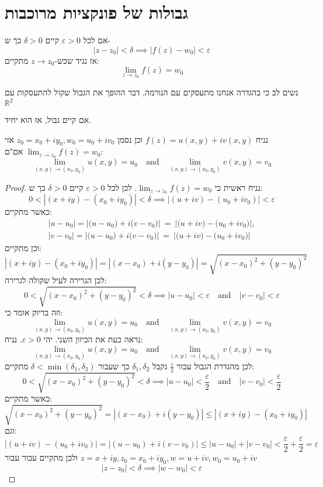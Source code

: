 \documentclass{tstextbook}
\begin{document}
\section{גבולות של פונקציות מרוכבות}

\begin{definition}
אם לכל \(\varepsilon>0\) קיים \(\delta>0\)  כך ש-
$$|z-z_{0}|<\delta\implies\lvert f(z)-w_{0} \rvert <\varepsilon$$
אז נגיד שכש-\(z\to z_{0}\) מתקיים:
$$\lim_{ z \to z_{0} } f(z)=w_{0}$$

\end{definition}
נשים לב כי בהגדרה אנחנו מתעסקים עם הנורמה, דבר ההופך את הגבול שקול להתעסקות עם \(\mathbb{R}^2\)

\begin{proposition}
אם קיים גבול, אז הוא יחיד.

\end{proposition}
\begin{proposition}
נניח \(f(z)=u(x,y)+i v(x,y)\) וכן נסמן \(z_{0}=x_{0}+iy_{0},w_{0}=u_{0}+iv_{0}\) אזי \(\operatorname*{lim}_{z\to z_{0}}f(z)=w_{0}\) אם"ם:
$$\operatorname*{lim}_{(x,y)\to(x_{0},y_{0})}u\left(x,y\right)=u_{0}\quad{\mathrm{and}}\quad\operatorname*{lim}_{(x,y)\to(x_{0},y_{0})}v\left(x,y\right)=v_{0}$$

\end{proposition}
\begin{proof}
נניח ראשית כי \(\lim_{ z \to z_{0} }f(z)=w_{0}\). לכן לכל \(\varepsilon>0\) קיים \(\delta>0\) כך ש:
$$0<|(x+i y)-(x_{0}+i y_{0})|<\delta\implies|(u+i v)-(u_{0}+i v_{0})|<\varepsilon$$
כאשר מתקיים:
$$\begin{array}{l}{{|u-u_{0}|=|\big(u-u_{0}\big)+i\big(v-v_{0}\big)|~=~|\big(u+i v\big)-\big(u_{0}+i v_{0}\big)|,}}\\ {{|v-v_{0}|=|\big(u-u_{0}\big)+i\big(v-v_{0}\big)|~=~|\big(u+i v\big)-\big(u_{0}+i v_{0}\big)|}}\end{array}$$
וכן מתקיים:
$$|(x+i y)-(x_{0}+i y_{0})|=|(x-x_{0})+i(y-y_{0})|={\sqrt{(x-x_{0})^{2}+(y-y_{0})^{2}}}$$
לכן הגרירה לעיל שקולה לגרירה:
$$0<\sqrt{(x-x_{0})^{2}+(y-y_{0})^{2}}<\delta\implies\left|u-u_{0}\right|<\varepsilon\quad{\mathrm{and}}\quad\left|v-v_{0}\right|<\varepsilon$$
וזה בדיוק אומר כי:
$$\operatorname*{lim}_{(x,y)\to(x_{0},y_{0})}u\left(x,y\right)=u_{0}\quad{\mathrm{and}}\quad\operatorname*{lim}_{(x,y)\to(x_{0},y_{0})}v\left(x,y\right)=v_{0}$$
נראה כעת את הכיוון השני. יהי \(\varepsilon>0\). נניח:
$$\operatorname*{lim}_{(x,y)\to(x_{0},y_{0})}u\left(x,y\right)=u_{0}\quad{\mathrm{and}}\quad\operatorname*{lim}_{(x,y)\to(x_{0},y_{0})}v\left(x,y\right)=v_{0}$$
לכן מהגדרת הגבול עבור \(\frac{\varepsilon}{2}\) נקבל \(\delta_{1},\delta_{2}\) כך שעבור \(\delta<\min\left( \delta_{1},\delta_{2} \right)\) מתקיים: 
$$0<\sqrt{(x-x_{0})^{2}+(y-y_{0})^{2}}<\delta \implies|u-u_{0}|<\frac{\varepsilon}{2}\quad{\mathrm{and}}\quad|v-v_{0}|<\frac{\varepsilon}{2}$$
כאשר מתקיים:
$${\sqrt{(x-x_{0})^{2}+(y-y_{0})^{2}}}=|(x-x_{0})+i(y-y_{0})|\leq|(x+i y)-(x_{0}+i y_{0})|$$
וגם:
$$|(u+i v)-(u_{0}+i v_{0})|=|(u-u_{0})+i(v-v_{0})|\leq|u-u_{0}|+|v-v_{0}|<\frac{\varepsilon}{2}+\frac{\varepsilon}{2}=\varepsilon$$
ולכן מתקיים עבור עבור \(z=x+iy,z_{0}=x_{0}+iy_{0},w=u+iv,w_{0}=u_{0}+iv\)$$|z-z_{0}|<\delta\implies |w-w_{0}|<\varepsilon$$

\end{proof}
\end{document}

